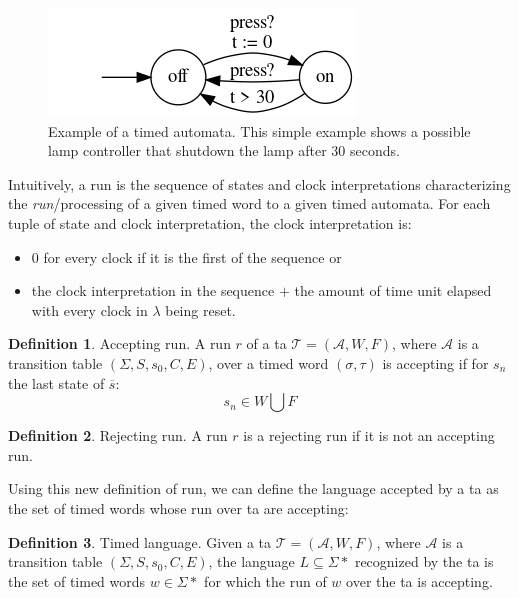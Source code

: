 \documentclass[12pt]{article}
\theoremstyle{definition}
\newtheorem{definition}{Definition}[section]
\theoremstyle{definition}
\newtheorem{example}{Example}[section]
\theoremstyle{remark}
\newcommand{\A}{\mathcal{A}}
\begin{document}
\begin{figure}
    \centering
    \includegraphics[scale=0.8]{timed_automata_lamp.png}
    \caption{Example of a timed automata. This simple example shows a possible lamp controller that shutdown the lamp after 30 seconds.}
    \label{timed_automata_lamp}
\end{figure}

Intuitively, a run is the sequence of states and clock interpretations characterizing the \textit{run}/processing of a given timed word to a given timed automata. For each tuple of state and clock interpretation, the clock interpretation is:
\begin{itemize}
\item $0$ for every clock if it is the first of the sequence or
\item the clock interpretation in the sequence $+$ the amount of time unit elapsed with every clock in $\lambda$ being reset.
\end{itemize}

\theoremstyle{definition}
\begin{definition}{Accepting run.} A run $r$ of a \gls{ta} $\mathcal{T} = (\A, W, F)$, where $\A$ is a transition table $(\Sigma, S, s_{0},C, E)$, over a timed word $(\sigma, \tau)$ is accepting if for $s_{n}$ the last state of $\overline{s}$:
$$s_{n} \in W \bigcup F$$
\end{definition}

\theoremstyle{definition}
\begin{definition}{Rejecting run.} A run $r$ is a rejecting run if it is not an accepting run.
\end{definition}

Using this new definition of run, we can define the language accepted by a \gls{ta} as the set of timed words whose run over \gls{ta} are accepting:

\theoremstyle{definition}
\begin{definition}{Timed language.} Given a \gls{ta} $\mathcal{T} = (\A, W, F)$, where $\A$ is a transition table $(\Sigma, S, s_{0},C, E)$, the language $L \subseteq \Sigma*$ recognized by the \gls{ta} is the set of timed words $w \in \Sigma*$ for which the run of $w$ over the \gls{ta} is accepting.
\end{definition}
\end{document}
